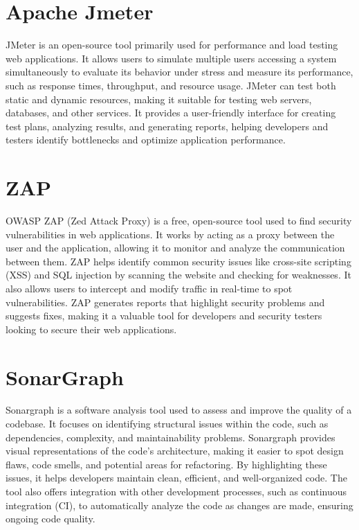 \documentclass[a4paper,11pt,openright,BCOR=15mm]{scrbook}
\begin{document}
	 \section{Apache Jmeter}
	 JMeter is an open-source tool primarily used for performance and load testing web applications. It allows users to simulate multiple users accessing a system simultaneously to evaluate its behavior under stress and measure its performance, such as response times, throughput, and resource usage. JMeter can test both static and dynamic resources, making it suitable for testing web servers, databases, and other services. It provides a user-friendly interface for creating test plans, analyzing results, and generating reports, helping developers and testers identify bottlenecks and optimize application performance.
	  
	 \section{ZAP}
	 OWASP ZAP (Zed Attack Proxy) is a free, open-source tool used to find security vulnerabilities in web applications. It works by acting as a proxy between the user and the application, allowing it to monitor and analyze the communication between them. ZAP helps identify common security issues like cross-site scripting (XSS) and SQL injection by scanning the website and checking for weaknesses. It also allows users to intercept and modify traffic in real-time to spot vulnerabilities. ZAP generates reports that highlight security problems and suggests fixes, making it a valuable tool for developers and security testers looking to secure their web applications.
	 
	 \section{SonarGraph}
	 Sonargraph is a software analysis tool used to assess and improve the quality of a codebase. It focuses on identifying structural issues within the code, such as dependencies, complexity, and maintainability problems. Sonargraph provides visual representations of the code’s architecture, making it easier to spot design flaws, code smells, and potential areas for refactoring. By highlighting these issues, it helps developers maintain clean, efficient, and well-organized code. The tool also offers integration with other development processes, such as continuous integration (CI), to automatically analyze the code as changes are made, ensuring ongoing code quality.
\end{document}
